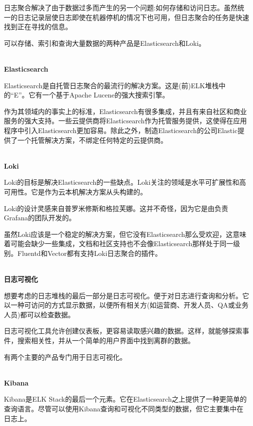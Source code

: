 日志聚合解决了由于数据过多而产生的另一个问题:如何存储和访问日志。虽然统一的日志记录层使日志即使在机器停机的情况下也可用，但日志聚合的任务是快速找到正在寻找的信息。

可以存储、索引和查询大量数据的两种产品是Elasticsearch和Loki。

\hspace*{\fill} \\ %
\noindent
\textbf{Elasticsearch}

Elasticsearch是自托管日志聚合的最流行的解决方案。这是(前)ELK堆栈中的“E”。它有一个基于Apache Lucene的强大搜索引擎。

作为其领域内的事实上的标准，Elasticsearch有很多集成，并且有来自社区和商业服务的强大支持。一些云提供商将Elasticsearch作为托管服务提供，这使得在应用程序中引入Elasticsearch更加容易。除此之外，制造Elasticsearch的公司Elastic提供了一个托管解决方案，不绑定任何特定的云提供商。

\hspace*{\fill} \\ %
\noindent
\textbf{Loki}

Loki的目标是解决Elasticsearch的一些缺点。Loki关注的领域是水平可扩展性和高可用性。它是作为云本机解决方案从头构建的。

Loki的设计灵感来自普罗米修斯和格拉芙娜。这并不奇怪，因为它是由负责Grafana的团队开发的。

虽然Loki应该是一个稳定的解决方案，但它没有Elasticsearch那么受欢迎，这意味着可能会缺少一些集成，文档和社区支持也不会像Elasticsearch那样处于同一级别。Fluentd和Vector都有支持Loki日志聚合的插件。

\hspace*{\fill} \\ %
\noindent
\textbf{日志可视化}

想要考虑的日志堆栈的最后一部分是日志可视化。便于对日志进行查询和分析。它以一种可访问的方式显示数据，以便所有相关方(如运营商、开发人员、QA或业务人员)都可以检查数据。

日志可视化工具允许创建仪表板，更容易读取感兴趣的数据。这样，就能够探索事件，搜索相关性，并从一个简单的用户界面中找到离群的数据。

有两个主要的产品专门用于日志可视化。

\hspace*{\fill} \\ %
\noindent
\textbf{Kibana}

Kibana是ELK Stack的最后一个元素。它在Elasticsearch之上提供了一种更简单的查询语言。尽管可以使用Kibana查询和可视化不同类型的数据，但它主要集中在日志上。

